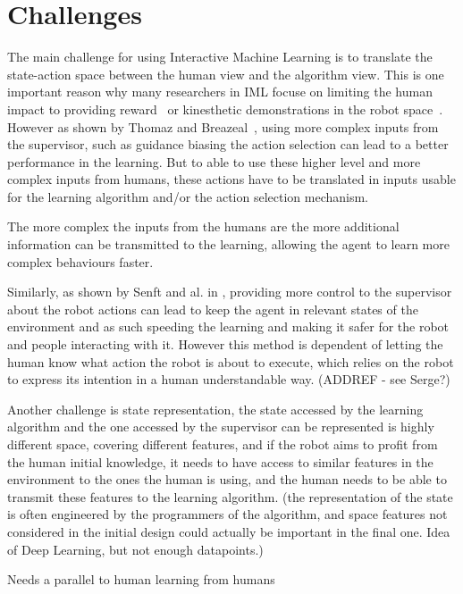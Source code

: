 \documentclass[letterpaper]{article} %
\begin{document}
\section{Challenges}

The main challenge for using Interactive Machine Learning is to translate the
state-action space between the human view and the algorithm view. This is one
important reason why many researchers in IML focuse on limiting the human impact
to providing reward~\cite{knox2009interactively} or kinesthetic demonstrations
in the robot space~\cite{billard2008robot}. However as shown by Thomaz and Breazeal~\cite{thomaz2008teachable}, using more complex inputs from the supervisor, such
as guidance biasing the action selection can lead to a better performance in the
learning. But to able to use these higher level and more complex inputs from
humans, these actions have to be translated in inputs usable for the learning
algorithm and/or the action selection mechanism. 

The more complex the inputs from the humans are the more additional information
can be transmitted to the learning, allowing the agent to learn more complex
behaviours faster.

Similarly, as shown by Senft and al. in \cite{senft2017supervised}, providing
more control to the supervisor about the robot actions can lead to keep the
agent in relevant states of the environment and as such speeding the learning
and making it safer for the robot and people interacting with it. However this
method is dependent of letting the human know what action the robot is about to
execute, which relies on the robot to express its intention in a human
understandable way. (ADDREF - see Serge?)

Another challenge is state representation, the state accessed by the learning
algorithm and the one accessed by the supervisor can be represented is highly
different space, covering different features, and if the robot aims to profit
from the human initial knowledge, it needs to have access to similar features in
the environment to the ones the human is using, and the human needs to be able
to transmit these features to the learning algorithm.
(the representation of the state is often engineered by the programmers of the
algorithm, and space features not considered in the initial design could
actually be important in the final one. Idea of Deep Learning, but not enough
datapoints.)

Needs a parallel to human learning from humans
\end{document}
